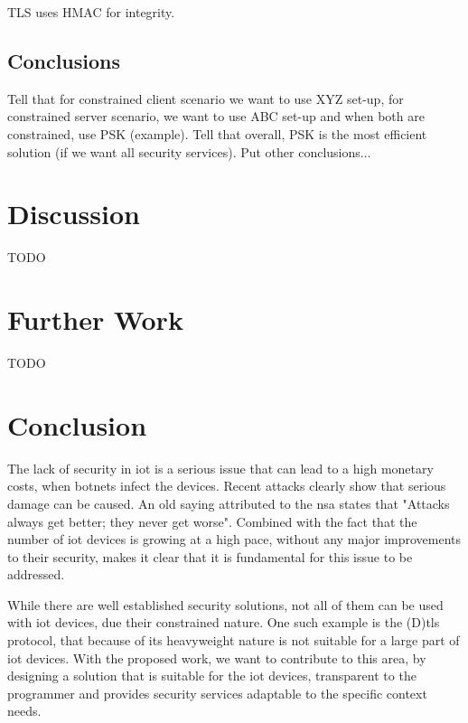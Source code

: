 \documentclass{llncs}
\begin{document}
TLS uses HMAC for integrity.

\subsection{Conclusions}

Tell that for constrained client scenario we want to use XYZ set-up, for constrained server scenario, we want to use
ABC set-up and when both are constrained, use PSK (example). Tell that overall, PSK is the most efficient solution
(if we want all security services). Put other conclusions...



\section{Discussion}

TODO

\section{Further Work}

TODO

\section{Conclusion} 
 
The lack of security in \gls{iot} is a serious issue that can lead to a high monetary costs,
when botnets infect the devices. Recent
attacks clearly show that serious damage can be caused. An old saying attributed to the
\gls{nsa} states that "Attacks always get better; they never get worse".
Combined with the fact that the number of \gls{iot} devices is growing at a high
pace, without any major improvements to their security, makes it clear
that it is fundamental for this issue to be addressed.

While there are well established security solutions, not all of them can be used
with \gls{iot} devices, due their constrained nature. One such example is
the (D)\gls{tls} protocol, that because of its heavyweight nature is not suitable for a large part of \gls{iot} devices. With the proposed work,
we want to contribute to this area, by designing a solution that is suitable for the \gls{iot} devices, transparent
to the programmer and provides security services adaptable to the specific context needs.

%
\nocite{*}


%
\printglossary[style=long]
%
\end{document}
